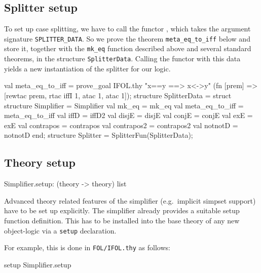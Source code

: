 \subsection{Splitter setup}

To set up case splitting, we have to call the \ML{} functor , which takes the argument signature \texttt{SPLITTER_DATA}. 
So we prove the theorem \texttt{meta_eq_to_iff} below and store it, together
with the \texttt{mk_eq} function described above and several standard
theorems, in the structure \texttt{SplitterData}. Calling the functor with
this data yields a new instantiation of the splitter for our logic.
\begin{ttbox}
val meta_eq_to_iff = prove_goal IFOL.thy "x==y ==> x<->y"
  (fn [prem] => [rewtac prem, rtac iffI 1, atac 1, atac 1]);
\ttbreak
structure SplitterData =
  struct
  structure Simplifier = Simplifier
  val mk_eq          = mk_eq
  val meta_eq_to_iff = meta_eq_to_iff
  val iffD           = iffD2
  val disjE          = disjE
  val conjE          = conjE
  val exE            = exE
  val contrapos      = contrapos
  val contrapos2     = contrapos2
  val notnotD        = notnotD
  end;
\ttbreak
structure Splitter = SplitterFun(SplitterData);
\end{ttbox}


\subsection{Theory setup}
\begin{ttbox}
Simplifier.setup: (theory -> theory) list
\end{ttbox}

Advanced theory related features of the simplifier (e.g.\ implicit
simpset support) have to be set up explicitly.  The simplifier already
provides a suitable setup function definition.  This has to be
installed into the base theory of any new object-logic via a
\texttt{setup} declaration.

For example, this is done in \texttt{FOL/IFOL.thy} as follows:
\begin{ttbox}
setup Simplifier.setup
\end{ttbox}




